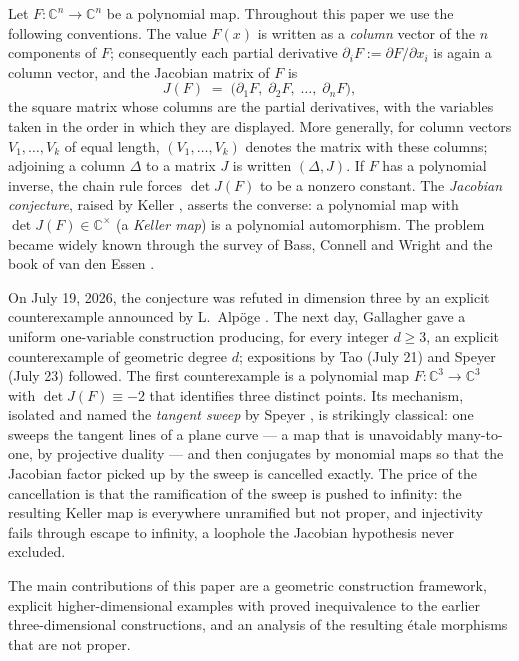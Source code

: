 \documentclass[11pt]{article}
\numberwithin{equation}{section}
\theoremstyle{plain}
\theoremstyle{definition}
\theoremstyle{remark}
\newcommand{\C}{\mathbb{C}}
\begin{document}
Let $F\colon\C^n\to\C^n$ be a polynomial map. Throughout this paper we use the
following conventions. The value $F(x)$ is written as a \emph{column} vector of
the $n$ components of $F$; consequently each partial derivative
$\partial_iF:=\partial F/\partial x_i$ is again a column vector, and the Jacobian
matrix of $F$ is
\[
J(F)\;=\;\bigl(\partial_1F,\;\partial_2F,\;\dots,\;\partial_nF\bigr),
\]
the square matrix whose columns are the partial derivatives, with the variables
taken in the order in which they are displayed. More generally, for column
vectors $V_1,\dots,V_k$ of equal length, $(V_1,\dots,V_k)$ denotes the matrix
with these columns; adjoining a column $\Delta$ to a matrix $J$ is written
$(\Delta,J)$. If $F$ has a polynomial inverse, the chain rule forces $\det J(F)$
to be a nonzero constant. The \emph{Jacobian conjecture}, raised by Keller
\cite{Keller1939}, asserts the converse: a polynomial map with
$\det J(F)\in\C^\times$ (a \emph{Keller map}) is a polynomial automorphism. The
problem became widely known through the survey of Bass, Connell and Wright
\cite{BCW1982} and the book of van den Essen \cite{Essen2000}.

On July 19, 2026, the conjecture was refuted in dimension three by an explicit
counterexample announced by L.~Alp\"oge \cite{Alpoge2026}. The next day,
Gallagher \cite{Gallagher2026} gave a uniform one-variable construction
producing, for every integer $d\ge3$, an explicit counterexample of geometric
degree $d$; expositions by Tao (July 21) \cite{Tao2026} and Speyer
(July 23) \cite{Speyer2026} followed. The first
counterexample is a polynomial map $F\colon\C^3\to\C^3$ with
$\det J(F)\equiv-2$ that identifies three distinct points. Its mechanism, isolated
and named the \emph{tangent sweep} by Speyer \cite{Speyer2026}, is strikingly
classical: one sweeps the tangent lines of a plane curve --- a map that
is unavoidably many-to-one, by projective duality --- and then conjugates by
monomial maps so that the Jacobian factor picked up by the sweep is cancelled
exactly. The price of the cancellation is that the ramification of the sweep is
pushed to infinity: the resulting Keller map is everywhere unramified but not
proper, and injectivity fails through escape to infinity, a loophole the Jacobian
hypothesis never excluded.

The main contributions of this paper are a geometric construction framework,
explicit higher-dimensional examples with proved inequivalence to the earlier
three-dimensional constructions, and an analysis of the resulting \'etale
morphisms that are not proper.
\end{document}
